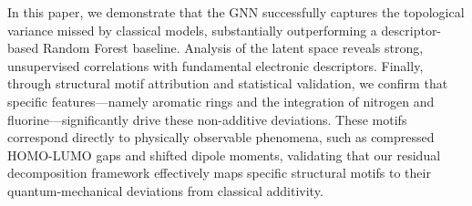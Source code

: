 \documentclass[]{article}
\begin{document}
In this paper, we demonstrate that the GNN successfully captures the topological variance missed by classical models, substantially outperforming a descriptor-based Random Forest baseline. \citep{shui2020heterogeneousmoleculargraphneural,liu2021fastquantumpropertyprediction,rittig2022graphneuralnetworksprediction} Analysis of the latent space reveals strong, unsupervised correlations with fundamental electronic descriptors. \citep{lu2019molecularpropertypredictionmultilevel,liu2021fastquantumpropertyprediction,arjonamedina2024analysisatomlevelpretrainingquantum} Finally, through structural motif attribution and statistical validation, we confirm that specific features---namely aromatic rings and the integration of nitrogen and fluorine---significantly drive these non-additive deviations. \citep{shui2020heterogeneousmoleculargraphneural,wang2022motifbasedgraphrepresentationlearning,yu2025magemodellevelgraphneural} These motifs correspond directly to physically observable phenomena, such as compressed HOMO-LUMO gaps and shifted dipole moments, validating that our residual decomposition framework effectively maps specific structural motifs to their quantum-mechanical deviations from classical additivity. \citep{lu2019molecularpropertypredictionmultilevel,shui2020heterogeneousmoleculargraphneural,liu2021fastquantumpropertyprediction}
\end{document}
